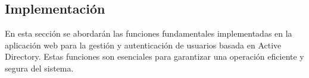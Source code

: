 \subsection{Implementación}

En esta sección se abordarán las funciones fundamentales implementadas en la aplicación web para la gestión y autenticación de usuarios basada en Active Directory. Estas funciones son esenciales para garantizar una operación eficiente y segura del sistema.



